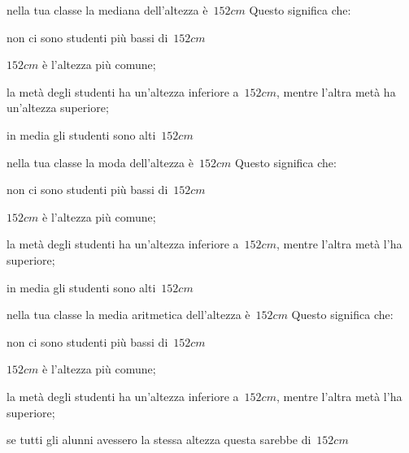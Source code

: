 \begin{esercizio}
\begin{enumerate*}
\begin{enumeratea}
 \end{enumeratea}
\item nella tua classe la mediana dell'altezza è~$152\unit{cm}$ Questo 
significa che:
 \begin{enumeratea}
\item non ci sono studenti più bassi di~$152\unit{cm}$
\item $152\unit{cm}$ è l'altezza più comune;
\item la metà degli studenti ha un'altezza inferiore a~$152\unit{cm}$, 
mentre l'altra metà ha un'altezza superiore;
\item in media gli studenti sono alti~$152\unit{cm}$
 \end{enumeratea}
\item nella tua classe la moda dell'altezza è~$152\unit{cm}$ Questo 
significa che:
 \begin{enumeratea}
\item non ci sono studenti più bassi di~$152\unit{cm}$
\item $152\unit{cm}$ è l'altezza più comune;
\item la metà degli studenti ha un'altezza inferiore a~$152\unit{cm}$, 
mentre l'altra metà l'ha superiore;
\item in media gli studenti sono alti~$152\unit{cm}$
 \end{enumeratea}
\item nella tua classe la media aritmetica dell'altezza è~$152\unit{cm}$ 
Questo significa che:
 \begin{enumeratea}
\item non ci sono studenti più bassi di~$152\unit{cm}$
\item $152\unit{cm}$ è l'altezza più comune;
\item la metà degli studenti ha un'altezza inferiore a~$152\unit{cm}$, 
mentre l'altra metà l'ha superiore;
\item se tutti gli alunni avessero la stessa altezza questa sarebbe 
di~$152\unit{cm}$
 \end{enumeratea}

\end{enumerate*}
\end{esercizio}

